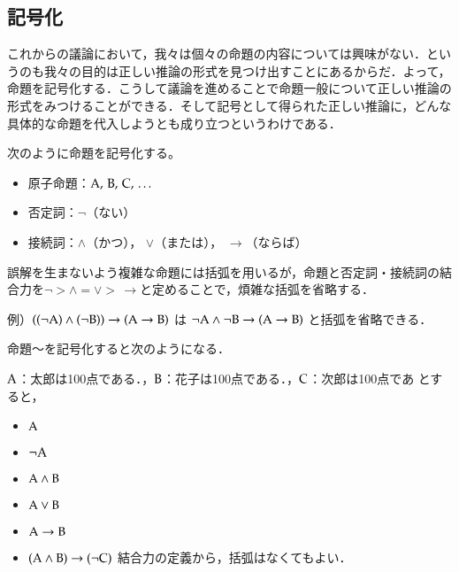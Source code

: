 \documentclass[10pt,b5paper,papersize,dvipdfmx]{jsbook}
\begin{document}
\subsection{記号化}
これからの議論において，我々は個々の命題の内容については興味がない．というのも我々の目的は正しい推論の形式を見つけ出すことにあるからだ．よって，命題を記号化する．こうして議論を進めることで命題一般について正しい推論の形式をみつけることができる．そして記号として得られた正しい推論に，どんな具体的な命題を代入しようとも成り立つというわけである．\par
次のように命題を記号化する。
\begin{itemize}
  \item 原子命題：$\mathrm{A},\, \mathrm{B},\, \mathrm{C},\, \dots$
  \item 否定詞：$\lnot$（ない）
  \item 接続詞：$\land$（かつ）， $\lor$（または）， $\to$（ならば）
\end{itemize}
誤解を生まないよう複雑な命題には括弧を用いるが，命題と否定詞・接続詞の結合力を$\lnot > \land = \lor > \,\to$と定めることで，煩雑な括弧を省略する．\par
例）$((\lnot \rmA) \land (\lnot \rmB)) \to (\rmA \to \rmB)$ は $\lnot \rmA \land \lnot \rmB \to (\rmA \to \rmB)$ と括弧を省略できる．\par
命題～を記号化すると次のようになる．\par
$\mathrm{A}$：太郎は100点である．，$\mathrm{B}$：花子は100点である．，$\mathrm{C}$：次郎は100点であ
とすると，
\begin{itemize} %
  \item[\maru{1}] $\mathrm{A}$
  \item[\maru{2}] $\lnot \mathrm{A}$
  \item[\maru{3}] $\mathrm{A} \land \mathrm{B}$
  \item[\maru{4}] $\mathrm{A} \lor \mathrm{B}$
  \item[\maru{5}] $\rmA \to \rmB$
  \item[\maru{6}] $(\rmA \land \rmB) \to (\lnot \rmC)$ 結合力の定義から，括弧はなくてもよい．
\end{itemize}
\end{document}
